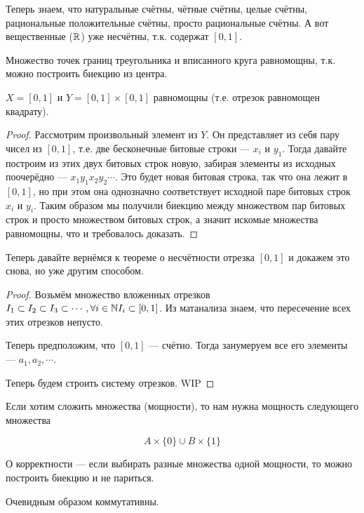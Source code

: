 Теперь знаем, что натуральные счётны, чётные счётны, целые счётны, рациональные положительные счётны, просто рациональные счётны. А вот вещественные ($\mathbb{R}$) уже несчётны, т.к. содержат $[0, 1]$.

\begin{example}
	Множество точек границ треугольника и вписанного круга равномощны, т.к. можно построить биекцию из центра. 
\end{example}

\begin{theorem}
	$X = [0, 1]$ и $Y = [0, 1] \times [0, 1]$ равномощны (т.е. отрезок равномощен квадрату).
\end{theorem}
\begin{proof}
	Рассмотрим произвольный элемент из $Y$. Он представляет из себя пару чисел из $[0, 1]$, т.е. две бесконечные битовые строки --- $x_i$ и $y_1$. Тогда давайте построим из этих двух битовых строк новую, забирая элементы из исходных поочерёдно --- $x_1 y_1 x_2 y_2 \cdots$. Это будет новая битовая строка, так что она лежит в $[0, 1]$, но при этом она однозначно соответствует исходной паре битовых строк $x_i$ и $y_i$. Таким образом мы получили биекцию между множеством пар битовых строк и просто множеством битовых строк, а значит искомые множества равномощны, что и требовалось доказать.
\end{proof}

Теперь давайте вернёмся к теореме о несчётности отрезка $[0, 1]$ и докажем это снова, но уже другим способом.

\begin{proof}
	Возьмём множество вложенных отрезков $I_1 \subset I_2 \subset I_3 \subset \cdots, \forall i \in \mathbb{N} I_i \subset [0, 1]$. Из матанализа знаем, что пересечение всех этих отрезков непусто. 

	Теперь предположим, что $[0, 1]$ --- счётно. Тогда занумеруем все его элементы --- $a_1, a_2, \cdots$. 

	Теперь будем строить систему отрезков. WIP
\end{proof}


Если хотим сложить множества (мощности), то нам нужна мощность следующего множества

{
\large
$$
A \times \{0\} \cup B \times \{1\}
$$
}

О корректности --- если выбирать разные множества одной мощности, то можно построить биекцию и не париться.

Очевидным образом коммутативны.

